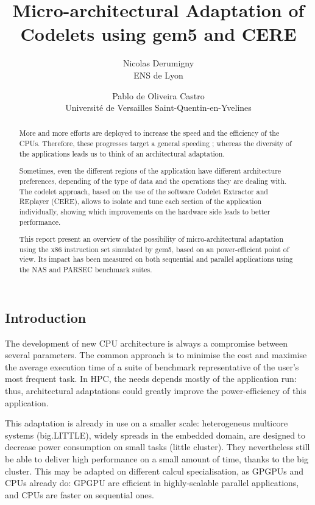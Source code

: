 \documentclass{article}
\title{Micro-architectural Adaptation of Codelets using gem5 and CERE}
\author{Nicolas Derumigny \\
\small ENS de Lyon 
\and Pablo de Oliveira Castro\\ 
\small Université de Versailles Saint-Quentin-en-Yvelines}
\date{}
\begin{document}
\maketitle

\smallskip

\begin{multicols}{2}

\begin{abstract}
More and more efforts are deployed to increase the speed and the efficiency of the CPUs. Therefore, these progresses target a general speeding ; whereas the diversity of the applications leads us to think of an architectural adaptation.


Sometimes, even the different regions of the application have different architecture preferences, depending of the type of data and the operations they are dealing with. The codelet approach, based on the use of the software Codelet Extractor and REplayer (CERE), allows to isolate and tune each section of the application individually, showing which improvements on the hardware side leads to better performance.


This report %
present an overview of the possibility of micro-architectural adaptation using the x86 instruction set simulated by gem5, based on an power-efficient point of view.%
 Its impact has been measured on both sequential and parallel applications using the NAS and PARSEC benchmark suites. 

\end{abstract}


\section{Introduction}
The development of new CPU architecture is always a compromise between several parameters. The common approach is to minimise the cost and maximise the average execution time of a suite of benchmark representative of the user's most frequent task. In HPC,%
the needs depends mostly of the application run: thus, architectural adaptations could greatly improve the power-efficiency of this application.


This adaptation is already in use on a smaller scale: heterogeneus multicore systems (big.LITTLE), widely spreads in the embedded domain, are designed to decrease power consumption on small tasks (little cluster). They nevertheless still be able to deliver high performance on a small amount of time, thanks to the big cluster. This may be adapted on different calcul specialisation, as GPGPUs and CPUs already do: GPGPU are efficient in highly-scalable parallel applications, and CPUs are faster on sequential ones.


\end{multicols}
\end{document}
